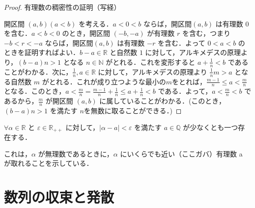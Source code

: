 \documentclass[a4paper]{ltjsarticle}
\begin{document}
\begin{proof}{有理数の稠密性の証明（写経）}{}

開区間 $(a, b) (a < b)$ を考える．$a < 0 < b$ ならば，開区間$(a, b)$ は有理数 $0$ を含む．$a < b < 0$ のとき，開区間 $(-b, -a)$ が有理数 $r$ を含む，つまり $-b < r < -a$ ならば，開区間$(a, b)$ は有理数 $-r$ を含む．よって $0 < a < b$ のときを証明すればよい．$b - a \in \mathbb{R}$ と自然数 $1$ に対して，アルキメデスの原理より，$(b - a)n > 1$ となる $n \in \mathbb{N}$ がとれる．これを変形すると $a + \frac{1}{n} < b$ であることがわかる．次に，$\frac{1}{n}, a \in \mathbb{R}$ に対して，アルキメデスの原理より $\frac{1}{n}m > a$ となる自然数 $m$ がとれる．これが成り立つような最小の$m$をとれば，$\frac{m - 1}{n} \leq a < \frac{m}{n}$ となる．このとき，$a < \frac{m}{n} = \frac{m - 1}{n} + \frac{1}{n} \leq a + \frac{1}{n} < b$ である．よって，$a < \frac{m}{n} < b$ であるから，$\frac{m}{n}$ が開区間 $(a, b)$ に属していることがわかる．(このとき，$(b-a)n > 1$ を満たす $n $を無数に取ることができる．)

\end{proof}
\begin{corollary}{}{}

$\forall \alpha \in \mathbb{R}$ と $\varepsilon \in \mathbb{R}_{++}$ に対して，$|\alpha - a| < \varepsilon$ を満たす $a \in \mathbb{Q}$ が少なくとも一つ存在する．

\end{corollary}
これは，$\alpha$ が無理数であるときに，$\alpha$ にいくらでも近い（ここガバ）有理数 a が取れることを示している．

\section{数列の収束と発散}
\end{document}
